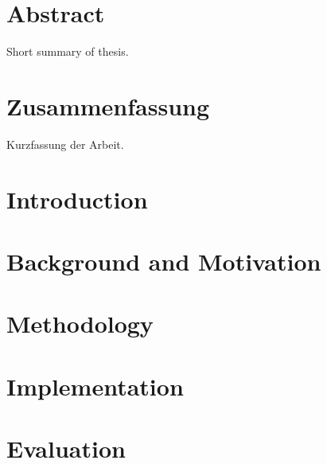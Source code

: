 \documentclass[11pt,a4paper]{book}
\begin{document}
\frontmatter


\chapter*{Abstract}
Short summary of thesis.

\chapter*{Zusammenfassung}
Kurzfassung der Arbeit.

\tableofcontents

\mainmatter
\chapter{Introduction}
\label{s:Introduction}


\chapter{Background and Motivation}
\label{s:Background}


\chapter{Methodology}
\label{s:Methodology}


\chapter{Implementation}
\label{s:Implementation}
% 

\chapter{Evaluation}
\label{s:Evaluation}

\end{document}

